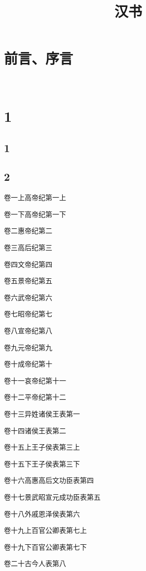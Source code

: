 \documentclass[12pt,UTF8]{ctexbook}
\title{\heiti\zihao{0} 汉书}
\author{}
\date{}
\begin{document}
\maketitle
\tableofcontents

\frontmatter
\chapter{前言、序言}

\mainmatter

~\\

 \qquad  

\chapter{1}
\section{1}
\section{2}

卷一上高帝纪第一上

卷一下高帝纪第一下

卷二惠帝纪第二

卷三高后纪第三

卷四文帝纪第四

卷五景帝纪第五

卷六武帝纪第六

卷七昭帝纪第七

卷八宣帝纪第八

卷九元帝纪第九

卷十成帝纪第十

卷十一哀帝纪第十一

卷十二平帝纪第十二

卷十三异姓诸侯王表第一

卷十四诸侯王表第二

卷十五上王子侯表第三上

卷十五下王子侯表第三下

卷十六高惠高后文功臣表第四

卷十七景武昭宣元成功臣表第五

卷十八外戚恩泽侯表第六

卷十九上百官公卿表第七上

卷十九下百官公卿表第七下

卷二十古今人表第八
\end{document}
